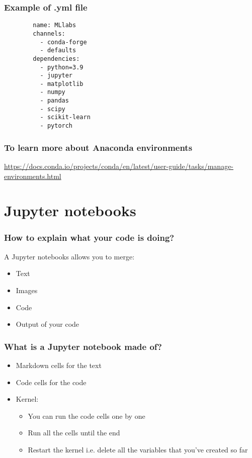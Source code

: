 \documentclass{beamer}
\begin{document}
	\begin{frame}[fragile]
	\frametitle{Example of .yml file}
	\begin{exampleblock}{}
		\begin{verbatim}
		name: MLlabs
		channels:
		  - conda-forge
		  - defaults
		dependencies:
		  - python=3.9
		  - jupyter
		  - matplotlib
		  - numpy
		  - pandas
		  - scipy
		  - scikit-learn
		  - pytorch
		\end{verbatim}
	\end{exampleblock}
	\end{frame}

	\begin{frame}
	\frametitle{To learn more about Anaconda environments}
        	\href{https://docs.conda.io/projects/conda/en/latest/user-guide/tasks/manage-environments.html}{https://docs.conda.io/projects/conda/en/latest/user-guide/tasks/manage-environments.html}
	\end{frame}

	\section*{Jupyter notebooks}

    	\begin{frame}
	\frametitle{How to explain what your code is doing?}
	A Jupyter notebooks allows you to merge:
	\begin{itemize}
	\setlength\itemsep{1em}
		\item Text
		\item Images
		\item Code
		\item Output of your code
	\end{itemize}
	\end{frame}

	\begin{frame}
	\frametitle{What is a Jupyter notebook made of?}
	\begin{itemize}
	\setlength\itemsep{1em}
		\item Markdown cells for the text
		\item Code cells for the code
		\item Kernel:
		\begin{itemize}
			\item You can run the code cells one by one
			\item Run all the cells until the end
			\item Restart the kernel i.e. delete all the variables that you've created so far
		\end{itemize}
	\end{itemize}
	\end{frame}
\end{document}
